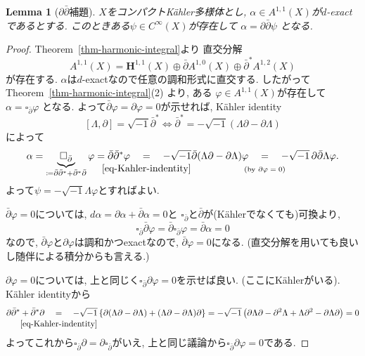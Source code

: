 \documentclass[dvipdfmx,a4paper,11pt]{article} %
\newtheorem{lem}[thm]{Lemma}
\theoremstyle{definition}
\theoremstyle{remark}
\numberwithin{equation}{section}
\newcommand{\underalign}[2]{%
  \quad
  \underset{\mathclap{\raisebox{-1.6ex}{\ensuremath{\scriptstyle #1}}}}{#2}
  \quad
}
\begin{document}
\begin{lem}[$\partial \bar\partial$補題]
\label{lem-ddc-lem-2}
$X$をコンパクトK\"ahler多様体とし, $\alpha\in A^{1,1}(X)$が$d$-exactであるとする.
このときある$\psi\in C^\infty(X)$が存在して
\(
\alpha=\partial\bar\partial\psi
\)
となる.
\end{lem}

\begin{proof}
Theorem~\ref{thm-harmonic-integral}より
直交分解
\[A^{1,1}(X)= \mathbf{H}^{1,1}(X)\oplus \bar\partial A^{1,0}(X) \oplus \bar\partial^{*}A^{1,2}(X)
\]
が存在する. 
$\alpha$は$d$-exactなので任意の調和形式に直交する.
したがってTheorem~\ref{thm-harmonic-integral}(2) より,
ある
$\varphi\in A^{1,1}(X)$が存在して
\(
\alpha=\square_{\bar\partial}\varphi
\)
となる. よって$\bar\partial\varphi=\partial\varphi=0$が示せれば, 
 K\"ahler identity
\begin{equation}
\label{eq-Kahler-indentity}
[\Lambda,\partial]=\sqrt{-1}\bar\partial^{*}
\iff
\bar\partial^*
=
-\sqrt{-1}
(\Lambda\partial-\partial\Lambda)
\end{equation}
によって
\[
\alpha
=\underbrace{\square_{\bar\partial}}_{\coloneqq\bar\partial\bar\partial^{*}+\bar\partial^{*}\bar\partial}\varphi
=\bar\partial\bar\partial^{*}\varphi
\underalign{\eqref{eq-Kahler-indentity}}{=} -\sqrt{-1}
\bar\partial(\Lambda\partial-\partial\Lambda)\varphi
\underalign{\text{(by $\partial\varphi=0$)}}{=}-\sqrt{-1}\,\partial\bar\partial\Lambda\varphi.
\]
よって$\psi=-\sqrt{-1}\Lambda\varphi$とすればよい.

$\bar\partial\varphi=0$については, $d\alpha=\partial\alpha+\bar\partial\alpha=0$と
$\square_{\bar\partial}$と$\bar \partial$が(K\"ahlerでなくても)可換より, 
\[
\square_{\bar\partial}\bar\partial\varphi=
\bar\partial\square_{\bar\partial}\varphi
=\bar\partial\alpha=0
\] 
なので, $\bar\partial\varphi$と$\partial\varphi$は調和かつexactなので, $\bar\partial\varphi=0$になる.  (直交分解を用いても良いし随伴による積分からも言える.)
 
 $\partial\varphi=0$については, 上と同じく$\square_{\bar\partial}\partial\varphi=0$を示せば良い. 
 (ここにK\"ahlerがいる). K\"ahler identityから
 \[
\partial\bar\partial^*+\bar\partial^*\partial
\underalign{\eqref{eq-Kahler-indentity}}{=}
-\sqrt{-1}
\left\{
\partial(\Lambda\partial-\partial\Lambda)
+
(\Lambda\partial-\partial\Lambda)\partial
\right\}
=
-\sqrt{-1}
\left(
\partial\Lambda\partial
-\partial^2\Lambda
+\Lambda\partial^2
-\partial\Lambda\partial
\right)
=0
 \]
よってこれから$
\square_{\bar\partial}\partial
=
\partial\square_{\bar\partial}
 $がいえ, 上と同じ議論から$\square_{\bar\partial}\partial\varphi=0$である. 
\end{proof}
\end{document}
